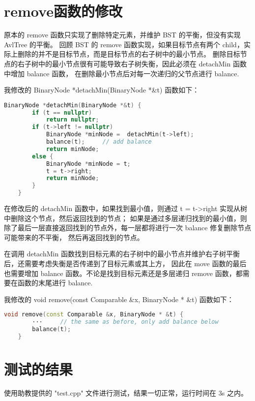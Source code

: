 \documentclass[UTF8]{ctexart}
\begin{document}
\pagestyle{fancy}
\fancyhead{}

\section{remove函数的修改}
原本的 remove 函数只实现了删除特定元素，并维护 BST 的平衡，但没有实现 AvlTree 的平衡。
回顾 BST 的 remove 函数实现，如果目标节点有两个 child，实际上删除的并不是目标节点，而是目标节点的右子树中的最小节点。
删除目标节点的右子树中的最小节点很有可能导致右子树失衡，因此必须在 detachMin 函数中增加 balance 函数，
在删除最小节点后对每一次递归的父节点进行 balance. 

我修改的 BinaryNode *detachMin(BinaryNode *\&t) 函数如下：
\begin{lstlisting}[language=c++, breaklines=true, keywordstyle=\color{blue!70}, commentstyle=\color{red!50!green!50!blue!50}, frame=shadowbox, rulesepcolor=\color{red!20!green!20!blue!20}]
    BinaryNode *detachMin(BinaryNode *&t) {
        if (t == nullptr)
            return nullptr;
        if (t->left != nullptr)
            BinaryNode *minNode =  detachMin(t->left);
            balance(t);     // add balance
            return minNode;
        else {
            BinaryNode *minNode = t;
            t = t->right;
            return minNode;
        }
    }
\end{lstlisting}

在修改后的 detachMin 函数中，如果找到最小值，则通过 t = t->right 实现从树中删除这个节点，然后返回找到的节点；
如果是通过多层递归找到的最小值，则除了最后一层直接返回找到的节点外，每一层都将进行一次 balance 修复删除节点可能带来的不平衡，
然后再返回找到的节点。

在调用 detachMin 函数找到目标元素的右子树中的最小节点并维护右子树平衡后，还需要考虑失衡是否传递到了目标元素或其上方，
因此在 move 函数的最后也需要增加 balance 函数。不论是找到目标元素还是多层递归 remove 函数，都需要在函数的末尾进行 balance. 

我修改的 void remove(const Comparable \&x, BinaryNode * \&t) 函数如下：
\begin{lstlisting}[language=c++, breaklines=true, keywordstyle=\color{blue!70}, commentstyle=\color{red!50!green!50!blue!50}, frame=shadowbox, rulesepcolor=\color{red!20!green!20!blue!20}]
    void remove(const Comparable &x, BinaryNode * &t) {
        ···     // the same as before, only add balance below
        balance(t); 
    }
\end{lstlisting}


\section{测试的结果}

使用助教提供的 "test.cpp" 文件进行测试，结果一切正常，运行时间在 3s 之内。
\end{document}
